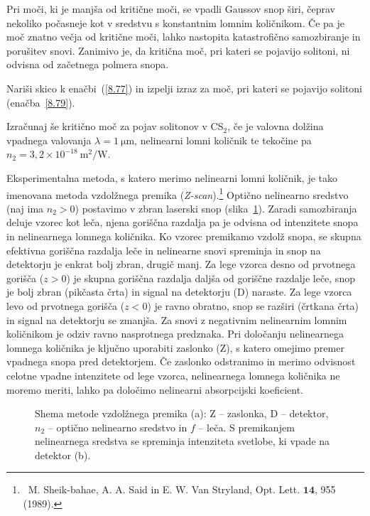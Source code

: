 Pri moči, ki je manjša od kritične moči, se vpadli Gaussov snop širi, 
čeprav nekoliko počasneje kot v sredstvu s konstantnim lomnim količnikom. 
Če pa je moč znatno večja od kritične moči, lahko
nastopita katastrofično samozbiranje in porušitev snovi.
Zanimivo je, da kritična moč, pri kateri se pojavijo solitoni, 
ni odvisna od začetnega polmera snopa.

\begin{naloga}
Nariši skico k enačbi~(\ref{8.77}) in izpelji izraz za moč, pri kateri se pojavijo
solitoni (enačba~\ref{8.79}). 

Izračunaj še kritično moč za pojav solitonov v CS$_{2}$, če je valovna
dolžina vpadnega valovanja $\lambda = 1~\si{\micro\metre}$, 
nelinearni lomni količnik te tekočine pa 
 $n_{2}=3,2 \times 10^{-18}~\si{\metre^2/\watt}$. 
\end{naloga}

\begin{remark}
Eksperimentalna metoda, 
s katero merimo nelinearni 
lomni količnik, je tako imenovana
metoda vzdolžnega premika ({\it Z-scan}).\footnote{~M. Sheik-bahae, A. A. Said in E. W. Van Stryland, 
Opt. Lett. $\mathbf{14}$, 955 (1989).} 
Optično nelinearno sredstvo (naj ima $n_2>0$)
postavimo v zbran laserski snop (slika~\ref{fig:zscan}). 
Zaradi samozbiranja deluje vzorec kot leča, njena goriščna razdalja
pa je odvisna od intenzitete snopa in nelinearnega lomnega količnika. Ko vzorec 
premikamo vzdolž snopa, se skupna efektivna goriščna razdalja leče in nelinearne snovi 
spreminja in snop na detektorju je enkrat bolj zbran, drugič manj. 
Za lege vzorca desno od prvotnega gorišča ($z>0$) je skupna goriščna
razdalja daljša od goriščne razdalje leče, snop je bolj zbran (pikčasta črta) in signal 
na detektorju (D) naraste. Za lege vzorca levo
od prvotnega gorišča ($z<0$) je ravno obratno, snop se razširi (črtkana črta) in 
signal na detektorju se zmanjša. Za snovi z negativnim nelinearnim lomnim količnikom
je odziv ravno nasprotnega predznaka. Pri določanju nelinearnega lomnega količnika je
ključno uporabiti zaslonko (Z), s katero omejimo premer vpadnega snopa pred detektorjem. 
Če zaslonko odstranimo in merimo 
odvisnost celotne vpadne intenzitete od lege vzorca, nelinearnega lomnega količnika 
ne moremo meriti, lahko pa določimo nelinearni absorpcijski koeficient. 
\begin{figure}[ht]
\raggedleft 
\def\svgwidth{118truemm} 

\captionsetup{width=0.82\textwidth}
\caption{Shema metode vzdolžnega premika (a): Z -- zaslonka, D -- detektor, $n_2$ -- optično
nelinearno sredstvo in $f$ -- leča. S premikanjem nelinearnega sredstva se spreminja intenziteta svetlobe, ki vpade na detektor (b).}
\label{fig:zscan}
\end{figure}
\end{remark}

